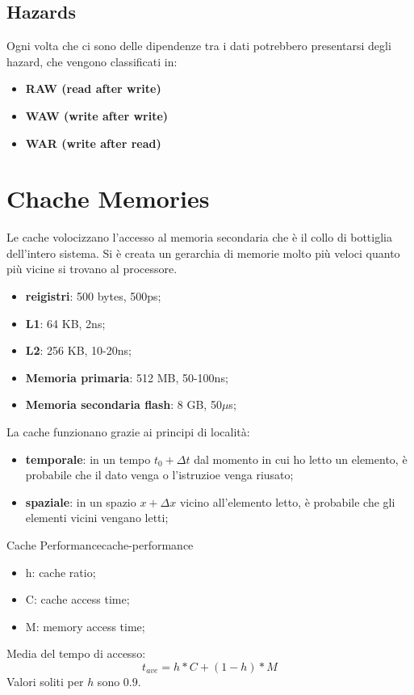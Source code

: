 \documentclass[12pt]{article}
\begin{document}
\subsection{Hazards}
Ogni volta che ci sono delle dipendenze tra i dati potrebbero presentarsi degli hazard, che vengono classificati in:
\begin{itemize}
    \item \textbf{RAW (read after write)}
    \item \textbf{WAW (write after write)}
    \item \textbf{WAR (write after read)}
\end{itemize}







\newpage
\section{Chache Memories}
Le cache volocizzano l'accesso al memoria secondaria che \`e il collo di bottiglia dell'intero sistema. Si \`e creata un gerarchia di memorie molto pi\`u veloci quanto pi\`u vicine si trovano al processore.
\begin{itemize}
    \item \textbf{reigistri}: 500 bytes, 500ps;
    \item \textbf{L1}: 64 KB, 2ns;
    \item \textbf{L2}: 256 KB, 10-20ns;
    \item \textbf{Memoria primaria}: 512 MB, 50-100ns;
    \item \textbf{Memoria secondaria flash}: 8 GB, 50$\mu$s;
\end{itemize}
La cache funzionano grazie ai principi di localit\`a:
\begin{itemize}
    \item \textbf{temporale}: in un tempo $t_0 + \Delta t$ dal momento in cui ho letto un elemento, \`e probabile che il dato venga o l'istruzioe venga riusato;
    \item \textbf{spaziale}: in un spazio $x + \Delta x$ vicino all'elemento letto, \`e probabile che gli elementi vicini vengano letti;
\end{itemize}

\begin{theorem}{Cache Performance}{cache-performance}
    \begin{itemize}
        \item h: cache ratio;
        \item C: cache access time;
        \item M: memory access time;
    \end{itemize}
    Media del tempo di accesso:
    \[ t_{ave} = h * C + (1-h) * M \]
    Valori soliti per $h$ sono $0.9$.
\end{theorem}
\end{document}
